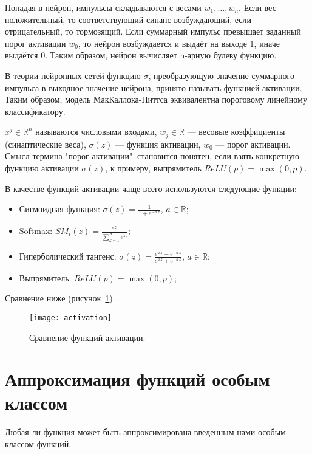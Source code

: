 \documentclass{article}
\begin{document}
	Попадая в нейрон, импульсы складываются с весами $w_1,\dots,w_n$. Если вес положительный, то соответствующий синапс возбуждающий, если отрицательный, то тормозящий. Если суммарный импульс превышает заданный порог активации $w_0$, то нейрон возбуждается и выдаёт на выходе 1, иначе выдаётся 0. Таким образом, нейрон вычисляет n-арную булеву функцию.
	
	В теории нейронных сетей функцию $\sigma$, преобразующую значение суммарного импульса в выходное значение нейрона, принято называть функцией активации. Таким образом, модель МакКаллока-Питтса эквивалентна пороговому линейному классификатору.
	
	$x^j \in \mathbb{R}^n$ называются числовыми входами, $w_j\in\mathbb{R}$ --- весовые коэффициенты (синаптические веса), $\sigma(z)$ --- функция активации, $w_0$ --- порог активации. Смысл термина "порог активации"$~$ становится понятен, если взять конкретную функцию активации $\sigma(z)$, к примеру, выпрямитель $ReLU(p) = \max (0,p)$.
	
	В качестве функций активации чаще всего используются следующие функции:
	\begin{itemize}
		\item Сигмоидная функция: $\sigma(z) = \frac{1}{1+e^{-a\,z}}$, $a \in \mathbb{R}$;
		\item Softmax: $SM_i(z)  = \frac{e^{z_i}}{\sum_{k=1}^{K}e^{z_k}}$;
		\item Гиперболический тангенс: $\sigma(z) = \frac{e^{a\,z} - e^{-a\,z}}{e^{a\,z} + e^{-a\,z}}$, $a \in \mathbb{R}$;
		\item Выпрямитель: $ReLU(p) = \max (0,p)$;
	\end{itemize}

	Сравнение ниже (рисунок~\ref{activation}). 
	
	\begin{figure}[H]
		\begin{center}
			\texttt{[image: activation]}
			\caption{Сравнение функций активации.} 
			\label{activation}
		\end{center}
	\end{figure}
	
	\section{Аппроксимация функций особым классом}
	
	Любая ли функция может быть аппроксимирована введенным нами особым классом функций.
	
\end{document}
